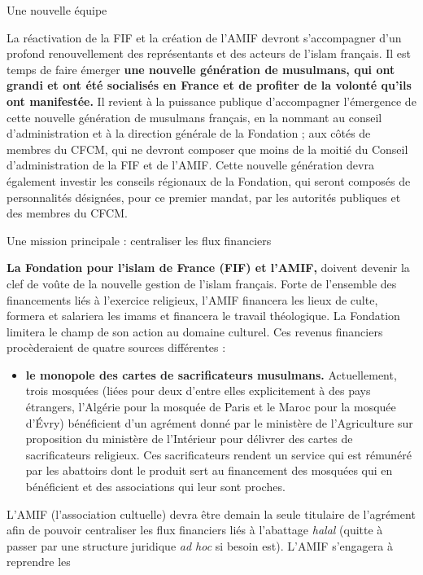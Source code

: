 Une nouvelle équipe


La réactivation de la FIF et la création de l'AMIF devront s'accompagner
d'un profond renouvellement des représentants et des acteurs de l'islam
français. Il est temps de faire émerger \textbf{une nouvelle génération
de musulmans, qui ont grandi et ont été socialisés en France et de
profiter de la volonté qu'ils ont manifestée.} Il revient à la puissance
publique d'accompagner l'émergence de cette nouvelle génération de
musulmans français, en la nommant au conseil d'administration et à la
direction générale de la Fondation ; aux côtés de membres du CFCM, qui
ne devront composer que moins de la moitié du Conseil d'administration
de la FIF et de l'AMIF. Cette nouvelle génération devra également
investir les conseils régionaux de la Fondation, qui seront composés de
personnalités désignées, pour ce premier mandat, par les autorités
publiques et des membres du CFCM.


Une mission principale : centraliser les flux financiers


\textbf{La Fondation pour l'islam de France (FIF) et l'AMIF,} doivent
devenir la clef de voûte de la nouvelle gestion de l'islam français.
Forte de l'ensemble des financements liés à l'exercice religieux, l'AMIF
financera les lieux de culte, formera et salariera les imams et
financera le travail théologique. La Fondation limitera le champ de son
action au domaine culturel. Ces revenus financiers procèderaient de
quatre sources différentes :


\begin{itemize}
\item
  \textbf{le monopole des cartes de sacrificateurs musulmans.}
  Actuellement, trois mosquées (liées pour deux d'entre elles
  explicitement à des pays étrangers, l'Algérie pour la mosquée de Paris
  et le Maroc pour la mosquée d'Évry) bénéficient d'un agrément donné
  par le ministère de l'Agriculture sur proposition du ministère de
  l'Intérieur pour délivrer des cartes de sacrificateurs religieux. Ces
  sacrificateurs rendent un service qui est rémunéré par les abattoirs
  dont le produit sert au financement des mosquées qui en bénéficient et
  des associations qui leur sont proches.
\end{itemize}


L'AMIF (l'association cultuelle) devra être demain la seule titulaire de
l'agrément afin de pouvoir centraliser les flux financiers liés à
l'abattage \emph{halal} (quitte à passer par une structure juridique
\emph{ad hoc} si besoin est). L'AMIF s'engagera à reprendre les

